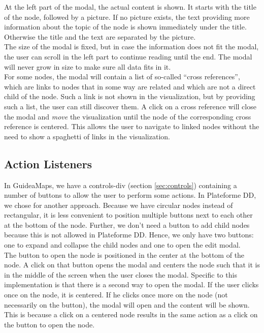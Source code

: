 At the left part of the modal, the actual content is shown. It starts with the title of the node, followed by a picture. If no picture exists, the text providing more information about the topic of the node is shown immediately under the title. Otherwise the title and the text are separated by the picture.\\

The size of the modal is fixed, but in case the information does not fit the modal, the user can scroll in the left part to continue reading until the end. The modal will never grow in size to make sure all data fits in it.\\

For some nodes, the modal will contain a list of so-called ``cross references'', which are links to nodes that in some way are related and which are not a direct child of the node. Such a link is not shown in the visualization, but by providing such a list, the user can still discover them. A click on a cross reference will close the modal and \textit{move} the visualization until the node of the corresponding cross reference is centered. This allows the user to navigate to linked nodes without the need to show a spaghetti of links in the visualization.



\subsection{Action Listeners}\label{sec:usecase-actionlisteners}
In GuideaMaps, we have a controls-div (section \ref{sec:controls}) containing a number of buttons to allow the user to perform some actions. In Plateforme DD, we chose for another approach. Because we have circular nodes instead of rectangular, it is less convenient to position multiple buttons next to each other at the bottom of the node. Further, we don't need a button to add child nodes because this is not allowed in Plateforme DD. Hence, we only have two buttons: one to expand and collapse the child nodes and one to open the edit modal.\\

The button to open the node is positioned in the center at the bottom of the node. A click on that button opens the modal and centers the node such that it is in the middle of the screen when the user closes the modal. Specific to this implementation is that there is a second way to open the modal. If the user clicks once on the node, it is centered. If he clicks once more on the node (not necessarily on the button), the modal will open and the content will be shown. This is because a click on a centered node results in the same action as a click on the button to open the node.\\

